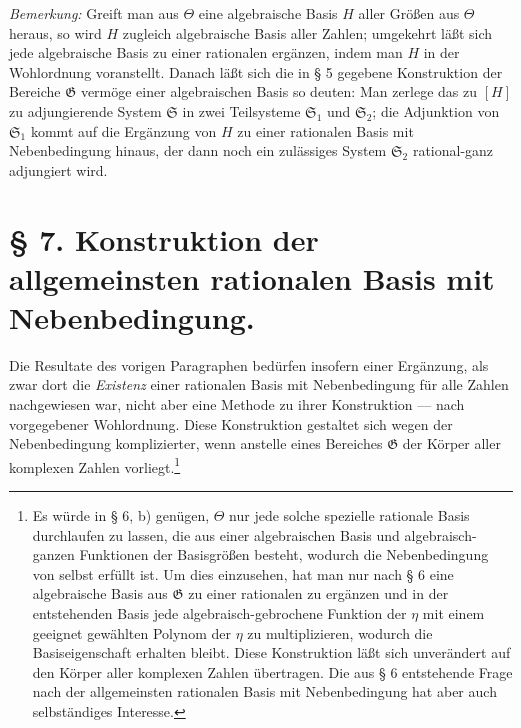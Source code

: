\documentclass[11pt]{article}
\begin{document}
\emph{Bemerkung:} Greift man aus $\Theta$ eine algebraische Basis $H$ aller
Größen aus $\Theta$ heraus, so wird $H$ zugleich algebraische Basis aller Zahlen;
umgekehrt läßt sich jede algebraische Basis zu einer rationalen ergänzen, indem
man $H$ in der Wohlordnung voranstellt. Danach läßt sich die in § 5 gegebene
Konstruktion der Bereiche $\mathfrak G$ vermöge einer algebraischen Basis so
deuten: Man zerlege das zu $[H]$ zu adjungierende System $\mathfrak S$ in zwei
Teilsysteme $\mathfrak S_1$ und $\mathfrak S_2$; die Adjunktion von
$\mathfrak S_1$ kommt auf die Ergänzung von $H$ zu einer rationalen Basis mit
Nebenbedingung hinaus, der dann noch ein zulässiges System $\mathfrak S_2$
rational-ganz adjungiert wird.

\section*{§ 7. Konstruktion der allgemeinsten rationalen Basis mit Nebenbedingung.}

Die Resultate des vorigen Paragraphen bedürfen insofern einer Ergänzung, als
zwar dort die \emph{Existenz} einer rationalen Basis mit Nebenbedingung für alle
Zahlen nachgewiesen war, nicht aber eine Methode zu ihrer Konstruktion --- nach
vorgegebener Wohlordnung. Diese Konstruktion gestaltet sich wegen der
Nebenbedingung komplizierter, wenn anstelle eines Bereiches $\mathfrak G$ der
Körper aller komplexen Zahlen vorliegt.\footnote{Es würde in § 6, b) genügen,
$\Theta$ nur jede solche spezielle rationale Basis durchlaufen zu lassen, die aus
einer algebraischen Basis und algebraisch-ganzen Funktionen der Basisgrößen
besteht, wodurch die Nebenbedingung von selbst erfüllt ist. Um dies einzusehen,
hat man nur nach § 6 eine algebraische Basis aus $\mathfrak G$ zu einer
rationalen zu ergänzen und in der entstehenden Basis jede algebraisch-gebrochene
Funktion der $\eta$ mit einem geeignet gewählten Polynom der $\eta$ zu
multiplizieren, wodurch die Basiseigenschaft erhalten bleibt. Diese Konstruktion
läßt sich unverändert auf den Körper aller komplexen Zahlen übertragen. Die aus
§ 6 entstehende Frage nach der allgemeinsten rationalen Basis mit Nebenbedingung
hat aber auch selbständiges Interesse.}
\end{document}
